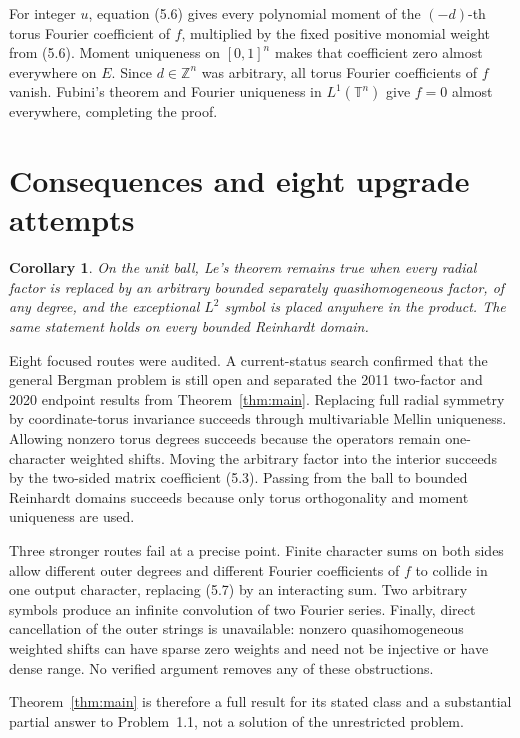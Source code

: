 \documentclass[11pt]{article}
\newtheorem{corollary}[theorem]{Corollary}
\newcommand{\Z}{\mathbb Z}
\newcommand{\T}{\mathbb T}
\begin{document}
For integer $u$, equation (5.6) gives every polynomial moment of the
$(-d)$-th torus Fourier coefficient of $f$, multiplied by the fixed positive
monomial weight from (5.6).  Moment uniqueness on $[0,1]^n$ makes that
coefficient zero almost everywhere on $E$.  Since $d\in\Z^n$ was arbitrary,
all torus Fourier coefficients of $f$ vanish.  Fubini's theorem and Fourier
uniqueness in $L^1(\T^n)$ give $f=0$ almost everywhere, completing the proof.

\section{Consequences and eight upgrade attempts}

\begin{corollary}
On the unit ball, Le's theorem remains true when every radial factor is
replaced by an arbitrary bounded separately quasihomogeneous factor, of any
degree, and the exceptional $L^2$ symbol is placed anywhere in the product.
The same statement holds on every bounded Reinhardt domain.
\end{corollary}

Eight focused routes were audited.  A current-status search confirmed that
the general Bergman problem is still open and separated the 2011 two-factor
and 2020 endpoint results from Theorem~\ref{thm:main}.  Replacing full radial
symmetry by coordinate-torus invariance succeeds through multivariable
Mellin uniqueness.  Allowing nonzero torus degrees succeeds because the
operators remain one-character weighted shifts.  Moving the arbitrary
factor into the interior succeeds by the two-sided matrix coefficient
(5.3).  Passing from the ball to bounded Reinhardt domains succeeds because
only torus orthogonality and moment uniqueness are used.

Three stronger routes fail at a precise point.  Finite character sums on
both sides allow different outer degrees and different Fourier coefficients
of $f$ to collide in one output character, replacing (5.7) by an interacting
sum.  Two arbitrary symbols produce an infinite convolution of two Fourier
series.  Finally, direct cancellation of the outer strings is unavailable:
nonzero quasihomogeneous weighted shifts can have sparse zero weights and
need not be injective or have dense range.  No verified argument removes any
of these obstructions.

Theorem~\ref{thm:main} is therefore a full result for its stated class and a
substantial partial answer to Problem~1.1, not a solution of the unrestricted
problem.
\end{document}
